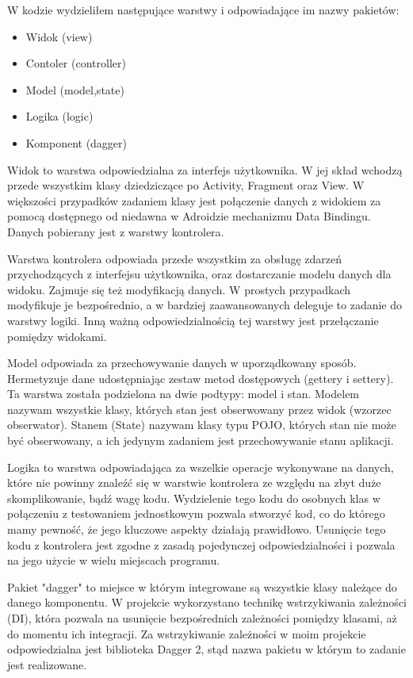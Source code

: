 \documentclass	{xmgr}
\begin{document}
W kodzie wydzieliłem następujące warstwy i odpowiadające im nazwy pakietów:
\begin{itemize}
	\item Widok (view)
	\item Contoler (controller)
	\item Model (model,state)
	\item Logika (logic)
	\item Komponent (dagger)
\end{itemize}

Widok to warstwa odpowiedzialna za interfejs użytkownika. W jej skład wchodzą przede wszystkim klasy dziedziczące po Activity, Fragment oraz View. W większości przypadków zadaniem klasy jest połączenie danych z widokiem za pomocą dostępnego od niedawna w Adroidzie mechanizmu Data Bindingu. Danych pobierany jest z warstwy kontrolera.

Warstwa kontrolera odpowiada przede wszystkim za obsługę zdarzeń przychodzących z interfejsu użytkownika, oraz dostarczanie modelu danych dla widoku. Zajmuje się też modyfikacją danych. W prostych przypadkach modyfikuje je bezpośrednio, a w bardziej zaawansowanych deleguje to zadanie do warstwy logiki. Inną ważną odpowiedzialnością tej warstwy jest przełączanie pomiędzy widokami. 

Model odpowiada za przechowywanie danych w uporządkowany sposób. Hermetyzuje dane udostępniając zestaw metod dostępowych (gettery i settery). Ta warstwa została podzielona na dwie podtypy: model i stan. Modelem nazywam wszystkie klasy, których stan jest obserwowany przez widok (wzorzec obserwator). Stanem (State) nazywam klasy typu POJO, których stan nie może być obserwowany, a ich jedynym zadaniem jest przechowywanie stanu aplikacji. 

Logika to warstwa odpowiadająca za wszelkie operacje wykonywane na danych, które nie powinny znaleźć się w warstwie kontrolera ze względu na zbyt duże skomplikowanie, bądź wagę kodu. Wydzielenie tego kodu do osobnych klas w połączeniu z testowaniem jednostkowym pozwala stworzyć kod, co do którego mamy pewność, że jego kluczowe aspekty działają prawidłowo. Usunięcie tego kodu z kontrolera jest zgodne z zasadą pojedynczej odpowiedzialności \cite{CleanCode:2005} i pozwala na jego użycie w wielu miejscach programu. 

Pakiet "dagger" to miejsce w którym integrowane są wszystkie klasy należące do danego komponentu. W projekcie wykorzystano technikę wstrzykiwania zależności (DI), która pozwala na usunięcie bezpośrednich zależności pomiędzy klasami, aż do momentu ich integracji. Za wstrzykiwanie zależności w moim projekcie odpowiedzialna jest biblioteka Dagger 2, stąd nazwa pakietu w którym to zadanie jest realizowane.
\end{document}
